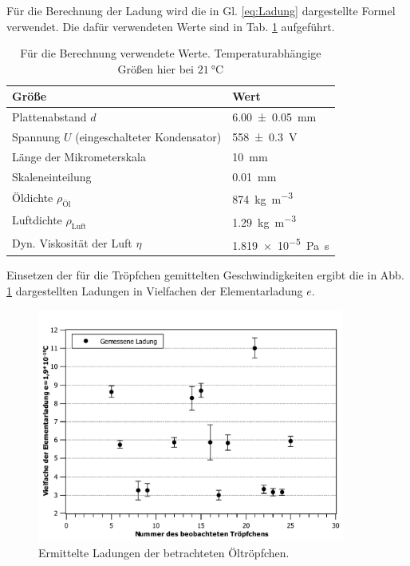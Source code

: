 Für die Berechnung der Ladung wird die in Gl. \ref{eq:Ladung} dargestellte Formel verwendet.
Die dafür verwendeten Werte sind in Tab. \ref{tab:werte} aufgeführt.
\begin{table}
	\centering
	\caption{Für die Berechnung verwendete Werte. Temperaturabhängige Größen hier bei $\SI{21}{\celsius}$}
	\label{tab:werte}
	\begin{tabular}{l|l}
		{Größe} & {Wert}	\\
		\hline
		{Plattenabstand $d$} & {\SI{6,00+-0,05}{\mm}} \\
		{Spannung $U$ (eingeschalteter Kondensator)} & \SI{558+-0.3}{\volt}\\
		{Länge der Mikrometerskala} & {\SI{10}{\mm}} \\
		{Skaleneinteilung} & {\SI{0,01}{\mm}} \\
		{Öldichte $\rho_\text{Öl}$} & {\SI{874}{\kg\per\m^3}} \\
		{Luftdichte $\rho_\text{Luft}$} & {\SI{1,29}{\kg\per\m^3}} \\
		{Dyn. Viskosität der Luft $\eta$} & \SI{1,819e-5}{\pascal\second}\\		
	\end{tabular}
\end{table}
Einsetzen der für die Tröpfchen gemittelten Geschwindigkeiten ergibt die in Abb. \ref{fig:ergebnis} dargestellten Ladungen in Vielfachen der Elementarladung $e$.
\begin{figure}[ht]
	\centering
	\includegraphics[width=0.9\textwidth]{auswertung/elementar_tropfen.pdf}
	\caption{Ermittelte Ladungen der betrachteten Öltröpfchen.}
	\label{fig:ergebnis}	
\end{figure}

